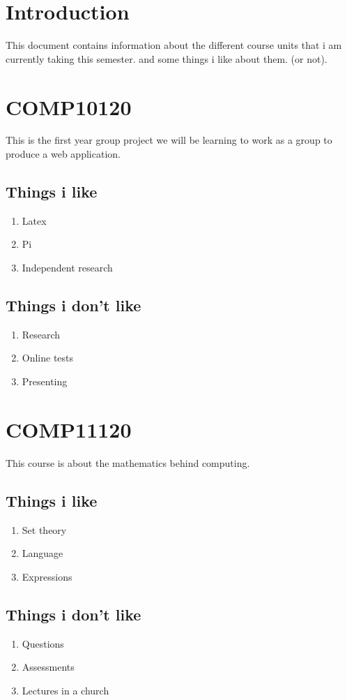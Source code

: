 \documentclass[a4paper]{article}
\begin{document}
\tableofcontents
\newpage
\section{Introduction}
This document contains information about the different course units that
i am currently taking this semester. and some things i like about them. (or not).
\section{COMP10120}
  This is the first year group project we will be learning to work as a group
  to produce a web application.
  \subsection{Things i like}
  \begin{enumerate}
    \item Latex
    \item Pi
    \item Independent research
  \end{enumerate}
  \subsection{Things i don't like}
  \begin{enumerate}
    \item Research
    \item Online tests
    \item Presenting
  \end{enumerate}
\section{COMP11120}
  This course is about the mathematics behind computing.
  \subsection{Things i like}
  \begin{enumerate}
    \item Set theory
    \item Language
    \item Expressions
  \end{enumerate}
  \subsection{Things i don't like}
  \begin{enumerate}
    \item Questions
    \item Assessments
    \item Lectures in a church
  \end{enumerate}
\end{document}
